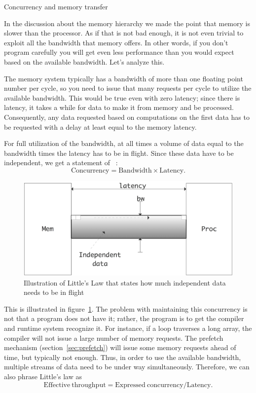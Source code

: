 
 {Concurrency and memory transfer}

In the discussion about the memory hierarchy we made the point that
memory is slower than the processor. As if that is not bad enough, it
is not even trivial to exploit all the bandwidth that memory
offers. In other words, if you don't program carefully you will get
even less performance than you would expect based on the available
bandwidth. Let's analyze this.

The memory system typically has a bandwidth of more than one floating
point number per cycle, so you need to issue that many requests per
cycle to utilize the available bandwidth. This would be true even with
zero latency; since there is latency, it takes a while for data to
make it from memory and be processed. Consequently, any data requested
based on computations on the first data has to be requested with a
delay at least equal to the memory latency.

For full utilization of the bandwidth,
at all times a volume of data equal to the bandwidth times
the latency has to be in flight. Since these data have to be
independent, we get a statement of ~\cite{Little:law}:
\[ \mathrm{Concurrency}=\mathrm{Bandwidth}\times \mathrm{Latency}. \]
\begin{figure}[ht]
  \includegraphics[scale=.13]{graphics/little}
  \caption{Illustration of Little's Law that states how much
    independent data needs to be in flight}
  \label{fig:little}
\end{figure}
This is illustrated in figure~\ref{fig:little}. The problem with
maintaining this concurrency is not that a program does not have it;
rather, the program is to get the compiler and runtime system
recognize it. For instance, if a loop traverses a long array, the
compiler will not issue a large number of memory requests. The
prefetch mechanism (section~\ref{sec:prefetch}) will issue some memory
requests ahead of time, but typically not enough. Thus, in order to
use the available bandwidth, multiple streams of data need to be under
way simultaneously. Therefore, we can also phrase Little's law as
\[ \mathrm{Effective\ throughput}=\mathrm{Expressed\ concurrency} / \mathrm{Latency}. \]


